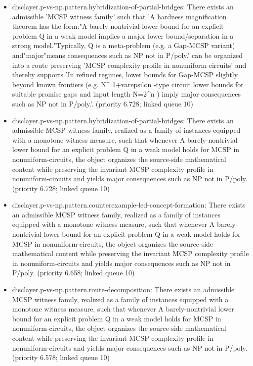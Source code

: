 \documentclass[11pt]{article}
\begin{document}
\begin{itemize}
\item disclayer.p-vs-np.pattern.hybridization-of-partial-bridges: There exists an admissible 'MCSP witness family' such that 'A hardness magnification theorem has the form:"A barely-nontrivial lower bound for an explicit problem Q in a weak model implies a major lower bound/separation in a strong model."Typically, Q is a meta-problem (e.g. a Gap-MCSP variant) and"major"means consequences such as NP not in P/poly.' can be organized into a route preserving 'MCSP complexity profile in nonuniform-circuits' and thereby supports 'In refined regimes, lower bounds for Gap-MCSP slightly beyond known frontiers (e.g. N\textasciicircum{} 1+varepsilon -type circuit lower bounds for suitable promise gaps and input length N=2\textasciicircum{}n ) imply major consequences such as NP not in P/poly.'. (priority 6.728; linked queue 10)
\item disclayer.p-vs-np.pattern.hybridization-of-partial-bridges: There exists an admissible MCSP witness family, realized as a family of instances equipped with a monotone witness measure, such that whenever A barely-nontrivial lower bound for an explicit problem Q in a weak model holds for MCSP in nonuniform-circuits, the object organizes the source-side mathematical content while preserving the invariant MCSP complexity profile in nonuniform-circuits and yields major consequences such as NP not in P/poly. (priority 6.728; linked queue 10)
\item disclayer.p-vs-np.pattern.counterexample-led-concept-formation: There exists an admissible MCSP witness family, realized as a family of instances equipped with a monotone witness measure, such that whenever A barely-nontrivial lower bound for an explicit problem Q in a weak model holds for MCSP in nonuniform-circuits, the object organizes the source-side mathematical content while preserving the invariant MCSP complexity profile in nonuniform-circuits and yields major consequences such as NP not in P/poly. (priority 6.658; linked queue 10)
\item disclayer.p-vs-np.pattern.route-decomposition: There exists an admissible MCSP witness family, realized as a family of instances equipped with a monotone witness measure, such that whenever A barely-nontrivial lower bound for an explicit problem Q in a weak model holds for MCSP in nonuniform-circuits, the object organizes the source-side mathematical content while preserving the invariant MCSP complexity profile in nonuniform-circuits and yields major consequences such as NP not in P/poly. (priority 6.578; linked queue 10)

\end{itemize}
\end{document}
